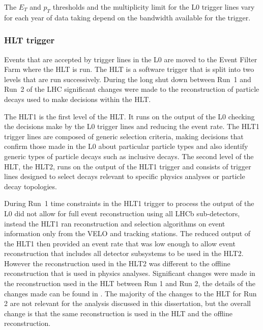 The $E_{T}$ and $p_{T}$ thresholds and the multiplicity limit for the L0 trigger lines vary for each year of data taking depend on the bandwidth available for the trigger. %


\subsubsection{HLT trigger}
\label{HLT}

Events that are accepted by trigger lines in the L0 are moved to the Event Filter Farm where the HLT is run. The HLT is a software trigger that is split into two levels that are run successively. During the long shut down between Run~1 and Run~2 of the LHC significant changes were made to the reconstruction of particle decays used to make decisions within the HLT. 


The HLT1 is the first level of the HLT. It runs on the output of the L0 checking the decisions make by the L0 trigger lines and reducing the event rate. %
The HLT1 trigger lines are composed of generic selection criteria, making decisions that confirm those made in the L0 about particular particle types and also identify generic types of particle decays such as inclusive \bhadron decays. 
The second level of the HLT, the HLT2, runs on the output of the HLT1 trigger and consists of trigger lines designed to select decays relevant to specific physics analyses or particle decay topologies.




During Run~1 time constraints in the HLT1 trigger to process the output of the L0 did not allow for full event reconstruction using all LHCb sub-detectors, instead the HLT1 ran reconstruction and selection algorithms on event information only from the VELO and tracking stations. The reduced output of the HLT1 then provided an event rate that was low enough to allow event reconstruction that includes all detector subsystems to be used in the HLT2. However the reconstruction used in the HLT2 was different to the offline reconstruction that is used in physics analyses. Significant changes were made in the reconstruction used in the HLT between Run 1 and Run 2, the details of the changes made can be found in \cite{Lupton:2230910}. The majority of the changes to the HLT for Run 2 are not relevant for the analysis discussed in this dissertation, but the overall change is that the same reconstruction is used in the HLT and the offline reconstruction. 

